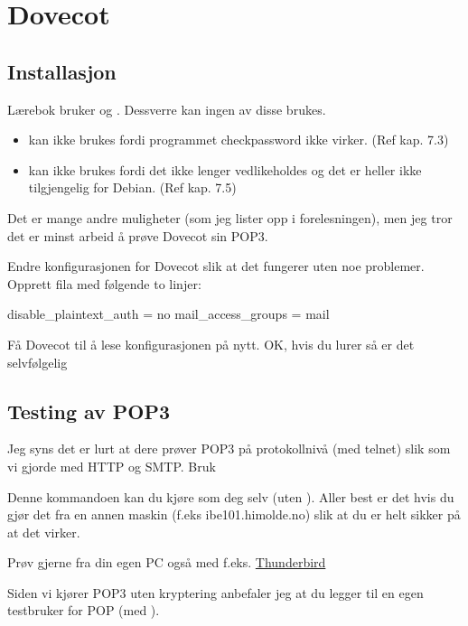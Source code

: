 \chapter{Dovecot} %

\section{Installasjon}

Lærebok bruker  og . Dessverre kan 
ingen av disse brukes.

\begin{itemize}
\item {} kan ikke brukes fordi programmet checkpassword ikke 
   virker. (Ref kap. 7.3)
\item {} kan ikke brukes fordi det ikke lenger vedlikeholdes og 
   det er heller ikke tilgjengelig for Debian. (Ref kap. 7.5)
\end{itemize}

Det er mange andre muligheter (som jeg lister opp i forelesningen),
men jeg tror det er minst arbeid å prøve Dovecot sin POP3. 


Endre konfigurasjonen for Dovecot slik at det fungerer uten noe problemer.
Opprett fila  med følgende to linjer:

\begin{filedata}
disable_plaintext_auth = no
mail_access_groups = mail
\end{filedata}

Få Dovecot til å lese konfigurasjonen på nytt. OK, hvis du lurer
så er det selvfølgelig
   

\section{Testing av POP3}

Jeg syns det er lurt at dere prøver POP3 på protokollnivå (med
telnet) slik som vi gjorde med HTTP og SMTP. Bruk


Denne kommandoen kan du kjøre som deg selv (uten ).
Aller best er det hvis du gjør det fra en annen maskin 
(f.eks ibe101.himolde.no) slik at du er helt sikker på at det virker.

Prøv gjerne fra din egen PC også med f.eks. 
\href{https://www.mozilla.org/nb-NO/thunderbird/}{Thunderbird}

\begin{remark}
Siden vi kjører POP3 uten kryptering anbefaler jeg at du 
legger til en egen testbruker for POP (med ).
\end{remark}